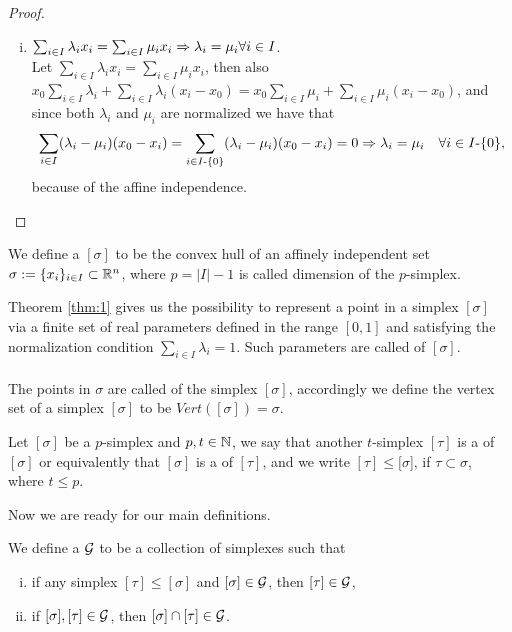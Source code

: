 \documentclass[../1.tex]{subfiles}
\begin{document}
\begin{proof}
\begin{enumerate}[(i)]
            \item $\sum_{i \in I} \lambda_i x_i = \sum_{i \in I} \mu_i x_i \Rightarrow \lambda_i = \mu_i \forall i \in I$.\\
            Let $\sum_{i \in I} \lambda_i x_i = \sum_{i \in I} \mu_i x_i$, then also $x_0\sum_{i \in I} \lambda_i + \sum_{i \in I} \lambda_i(x_i-x_0) = 
            x_0\sum_{i \in I} \mu_i +\sum_{i \in I} \mu_i (x_i - x_0)$, and since both $\lambda_i$ and $\mu_i$ are normalized we have that
            \[ \sum_{i \in I} (\lambda_i - \mu_i) (x_0 - x_i) = \sum_{i \in I \text{-} \{0\}} (\lambda_i - \mu_i) (x_0 - x_i) = 0 \Rightarrow \lambda_i = \mu_i \quad \forall i \in I \text{-} \{0\},\]
            because of the affine independence. \qedhere
        \end{enumerate}
    \end{proof}
  
    \begin{defn}
        We define a  $[\sigma]$ to be the convex hull of an affinely independent set $\sigma := \{x_i\}_{i \in I} \subset \mathbb{R}^n$,
        where $p = |I|-1$ is called dimension of the $p$-simplex. 
    \end{defn}

    Theorem \ref{thm:1} gives us the possibility to represent a point in a simplex $[\sigma]$ via a finite set of real parameters defined in the range $[0,1]$
    and satisfying the normalization condition $\sum_{i \in I } \lambda_i = 1$. Such parameters are called  of $[\sigma]$.\\
    \hfill \\
    The points in $\sigma$ are called  of the simplex $[\sigma]$, accordingly we define the vertex set of a simplex $[\sigma]$ to be 
    $Vert([\sigma]) = \sigma$.
    
    \begin{defn}
        Let $[\sigma]$ be a $p$-simplex and $p,t \in \mathbb{N}$, we say that another $t$-simplex $[\tau]$ is a  of $[\sigma]$ or equivalently 
        that $[\sigma]$ is a  of $[\tau]$, and we write $[\tau] \leq [\sigma$], if $\tau \subset \sigma$, where $t \leq p$.
    \end{defn}

    Now we are ready for our main definitions.
    
    \begin{defn}
        We define a  $\mathcal{G}$ to be a collection of simplexes such that
        \begin{enumerate}[(i)]
            \item if any simplex $ [\tau] \leq [\sigma]$ and $[\sigma] \in \mathcal{G}$, then $ [\tau] \in \mathcal{G}$,
            \item if $ [\sigma], [\tau] \in \mathcal{G}$, then $[\sigma] \cap [\tau] \in \mathcal{G}$.
        \end{enumerate}
    \end{defn}
\end{document}
